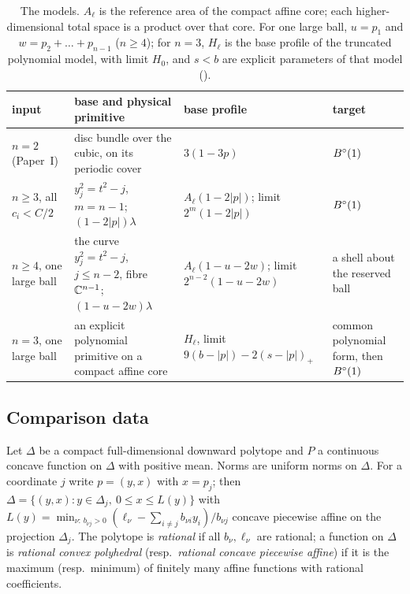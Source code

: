 \begin{table}[ht]
\centering\footnotesize
\renewcommand{\arraystretch}{1.2}
\begin{tabular}{@{}L{.16\textwidth}L{.24\textwidth}L{.25\textwidth}L{.25\textwidth}@{}}
\toprule
input & base and physical primitive & base profile & target\\\midrule
$n=2$ (Paper~I) & disc bundle over the cubic, on its periodic cover & $3(1-3p)$ & $B^{\circ}(1)$\\
$n\ge3$, all $c_i<C/2$ & $y_j^2=t^2-j$, $m=n-1$; $(1-2|p|)\lambda$ & $A_\ell(1-2|p|)$; limit $2^m(1-2|p|)$ & $B^{\circ}(1)$\\
$n\ge4$, one large ball & the curve $y_j^2=t^2-j$, $j\le n-2$, fibre $\mathbb{C}^{n-1}$; $(1-u-2w)\lambda$ & $A_\ell(1-u-2w)$; limit $2^{n-2}(1-u-2w)$ & a shell about the reserved ball\\
$n=3$, one large ball & an explicit polynomial primitive on a compact affine core & $H_\ell$, limit $9(b-|p|)-2(s-|p|)_+$ & common polynomial form, then $B^{\circ}(1)$\\\bottomrule
\end{tabular}
\caption{The models. $A_\ell$ is the reference area of the compact affine core; each
higher-dimensional total space is a product over that core. For one large ball, $u=p_1$ and $w=p_2+\dots+p_{n-1}$
($n\ge4$); for $n=3$, $H_\ell$ is the base profile of the truncated polynomial model, with limit $H_0$, and
$s<b$ are explicit parameters of that model ().}
\label{tab:mech-models}
\end{table}

\subsection{Comparison data}\label{p2:sec-machine-cmp}

Let $\Delta$ be a compact full-dimensional downward polytope and $P$ a continuous concave function on $\Delta$ with
positive mean. Norms are uniform norms on $\Delta$. For a coordinate $j$ write $p=(y,x)$ with $x=p_j$; then
$\Delta=\{(y,x):y\in\Delta_j,\ 0\le x\le L(y)\}$ with
$L(y)=\min_{\nu:\,b_{\nu j}>0}(\ell_\nu-\sum_{i\ne j}b_{\nu i}y_i)/b_{\nu j}$ concave piecewise affine on the projection
$\Delta_j$. The polytope is \emph{rational} if all $b_\nu,\ell_\nu$ are rational; a function on $\Delta$ is
\emph{rational convex polyhedral} (resp.\ \emph{rational concave piecewise affine}) if it is the maximum (resp.\
minimum) of finitely many affine functions with rational coefficients.

